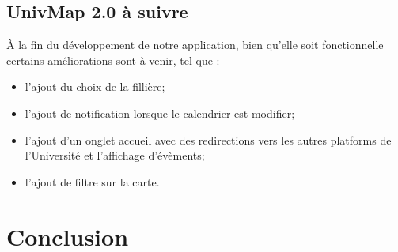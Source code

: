 \documentclass{article}
\begin{document}
\subsection{UnivMap 2.0 à suivre}
À la fin du développement de notre application,  bien qu'elle soit fonctionnelle certains améliorations sont à venir, tel que :
\begin{itemize}
    \item l'ajout du choix de la fillière;

    \item l'ajout de notification lorsque le calendrier est modifier;

    \item l'ajout d'un onglet accueil avec des redirections vers les autres platforms de l'Université et l'affichage d'évèments;
    
    \item l'ajout de filtre sur la carte.
    
\end{itemize}



\section{Conclusion}




\end{document}
